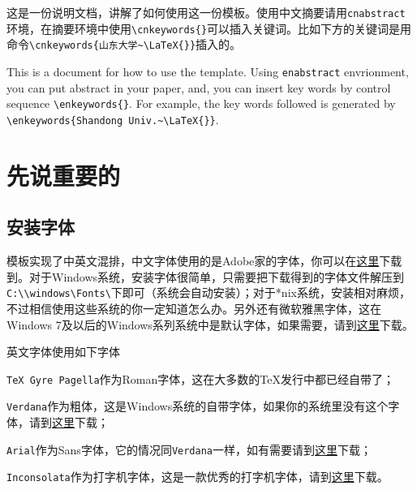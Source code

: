 \begin{cnabstract}
这是一份说明文档，讲解了如何使用这一份模板。使用中文摘要请用\verb|cnabstract|环境，在摘要环境中使用\verb|\cnkeywords{}|可以插入关键词。比如下方的关键词是用命令\verb|\cnkeywords{山东大学~\LaTeX{}}|插入的。

\end{cnabstract}

\begin{enabstract}
This is a document for how to use the template. Using \verb|enabstract| envrionment, you can put abstract in your paper, and, you can insert key words by control sequence \verb|\enkeywords{}|. For example, the key words followed is generated by \verb|\enkeywords{Shandong Univ.~\LaTeX{}}|.

\end{enabstract}
\chapter{先说重要的}
\section{安装字体}
模板实现了中英文混排，中文字体使用的是Adobe家的字体，你可以在\href{http://ishare.iask.sina.com.cn/f/15105086.html}{这里}下载到。对于Windows系统，安装字体很简单，只需要把下载得到的字体文件解压到
\verb|C:\\windows\Fonts\|下即可（系统会自动安装）；对于*nix系统，安装相对麻烦，不过相信使用这些系统的你一定知道怎么办。另外还有微软雅黑字体，这在Windows 7及以后的Windows系列系统中是默认字体，如果需要，请到\href{http://xiazai.zol.com.cn/detail/26/253442.shtml}{这里}下载。

英文字体使用如下字体
\begin{compactitem}
\item \texttt{TeX Gyre Pagella}作为Roman字体，这在大多数的\TeX{}发行中都已经自带了；
\item \texttt{Verdana}作为粗体，这是Windows系统的自带字体，如果你的系统里没有这个字体，请到\href{http://www.font5.com.cn/font_download.php?id=900&part=1249309256}{这里}下载；
\item \texttt{Arial}作为Sans字体，它的情况同\texttt{Verdana}一样，如有需要请到\href{http://font.chinaz.com/120308013581.htm}{这里}下载；
\item \texttt{Inconsolata}作为打字机字体，这是一款优秀的打字机字体，请到\href{http://ishare.iask.sina.com.cn/f/20566600.html}{这里}下载。
\end{compactitem}

